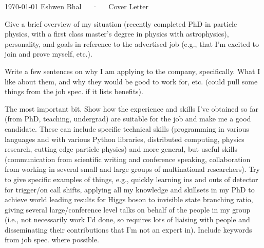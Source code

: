 \documentclass[12pt, a4paper]{awesome-cv}
\begin{document}
\makecvheader[C]

 \makecvfooter
   {\today}
   {Eshwen Bhal~~~·~~~Cover Letter}
   {\thepage}

\makelettertitle

\begin{cvletter}

Give a brief overview of my situation (recently completed PhD in particle physics, with a first class master’s degree in physics with astrophysics), personality, and goals in reference to the advertised job (e.g., that I'm excited to join and prove myself, etc.).

Write a few sentences on why I am applying to the company, specifically.
What I like about them, and why they would be good to work for, etc. (could pull some things from the job spec. if it lists benefits).

The most important bit.
Show how the experience and skills I've obtained so far (from PhD, teaching, undergrad) are suitable for the job and make me a good candidate.
These can include specific technical skills (programming in various languages and with various Python libraries, distributed computing, physics research, cutting edge particle physics) and more general, but useful skills (communication from scientific writing and conference speaking, collaboration from working in several small and large groups of multinational researchers).
Try to give specific examples of things, e.g., quickly learning ins and outs of detector for trigger/on call shifts, applying all my knowledge and skillsets in my PhD to achieve world leading results for Higgs boson to invisible state branching ratio, giving several large/conference level talks on behalf of the people in my group (i.e., not necessarily work I'd done, so requires lots of liaising with people and disseminating their contributions that I'm not an expert in).
Include keywords from job spec. where possible.

\end{cvletter}
    
\makeletterclosing
    
\end{document}
